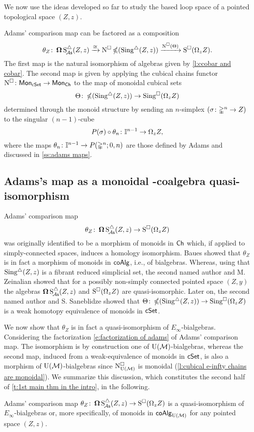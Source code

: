We now use the ideas developed so far to study the based loop space of a pointed topological space $(Z,z)$.

Adams' comparison map can be factored as a composition
\begin{equation}\label{e:factorization of adams}
	\theta_Z \colon \operatorname{\mathbf{\Omega}} \operatorname{S^{\triangle}_{\!{\mathcal{A}\mathsf{s}}}}(Z,z) \xrightarrow{\cong}
	\operatorname{N^{\square}} \operatorname{\mathbb{\Omega}}(\operatorname{Sing^{\triangle}}(Z,z)) \xrightarrow{\operatorname{N^{\square}}(\Theta)}
	\operatorname{S^{\square}}(\Omega_z Z).
\end{equation}
The first map is the natural isomorphism of algebras given by \cref{l:ccobar and cobar}.
The second map is given by applying the cubical chains functor $\operatorname{N^{\square}} \colon \mathsf{Mon}_{\mathsf{cSet}} \to \mathsf{Mon}_{\mathsf{Ch}}$ to the map of monoidal cubical sets
\[
\Theta \colon \operatorname{\mathbb{\Omega}}(\operatorname{Sing^{\triangle}}(Z,z)) \to \operatorname{Sing^{\square}}(\Omega_z Z)
\]
determined through the monoid structure by sending an $n$-simplex $(\sigma \colon \mathbb{\Delta}^n \to Z)$ to the singular $(n-1)$-cube
\[
P(\sigma) \circ \theta_n \colon \mathbb{I}^{n-1} \to \Omega_z Z,
\]
where the maps $\theta_n \colon \mathbb{I}^{n-1} \to P(\mathbb{\Delta}^n;0,n)$ are those defined by Adams and discussed in \cref{ss:adams maps}.

\subsection{Adams's map as a monoidal \pdfEinfty-coalgebra quasi-isomorphism}

Adams' comparison map
\[
\theta_Z \colon \operatorname{\mathbf{\Omega}} \operatorname{S^{\triangle}_{\!{\mathcal{A}\mathsf{s}}}}(Z,z) \to \operatorname{S^{\square}}(\Omega_z Z)
\]
was originally identified to be a morphism of monoids in $\mathsf{Ch}$ which, if applied to simply-connected spaces, induces a homology isomorphism.
Baues showed that $\theta_Z$ is in fact a morphism of monoids in $\mathsf{coAlg}$, i.e., of bialgebras.
Whereas, using that $\operatorname{Sing^{\triangle}}(Z,z)$ is a fibrant reduced simplicial set, the second named author and M. Zeinalian \cite{rivera2018cubical} showed that for a possibly non-simply connected pointed space $(Z,y)$ the algebras $\operatorname{\mathbf{\Omega}} \operatorname{S^{\triangle}_{\!{\mathcal{A}\mathsf{s}}}}(Z,z)$ and $\operatorname{S^{\square}}(\Omega_zZ)$ are quasi-isomorphic.
Later on, the second named author and S. Saneblidze
\cite{rivera2019path} showed that $\Theta \colon \operatorname{\mathbb{\Omega}}(\operatorname{Sing^{\triangle}}(Z,z)) \to \operatorname{Sing^{\square}}(\Omega_z Z)$ is a weak homotopy equivalence of monoids in $\mathsf{cSet}$.

We now show that $\theta_Z$ is in fact a quasi-isomorphism of $E_{\infty}$-bialgebras.
Considering the factorization \eqref{e:factorization of adams} of Adams' comparison map.
The isomorphism is by construction one of ${\operatorname{U}(\mathcal{M})}$-bialgebras, whereas the second map, induced from a weak-equivalence of monoids in $\mathsf{cSet}$, is also a morphism of ${\operatorname{U}(\mathcal{M})}$-bialgebras
since $\operatorname{N^{\square}_{{\operatorname{U}(\mathcal{M})}}}$ is monoidal (\cref{l:cubical e-infty chains are monoidal}).
We summarize this discussion, which constitutes the second half of \cref{t:1st main thm in the intro}, in the following.

\begin{lemma}\label{l:adams comparison is an e-infty bialgebra map}
	Adams' comparison map $\theta_Z \colon \operatorname{\mathbf{\Omega}} \operatorname{S^{\triangle}_{\!{\mathcal{A}\mathsf{s}}}}(Z,z) \to \operatorname{S^{\square}}(\Omega_z Z)$ is a quasi-isomorphism of $E_{\infty}$-bialgebras or, more specifically, of monoids in $\mathsf{coAlg}_{\operatorname{U}(\mathcal{M})}$ for any pointed space $(Z,z)$.
\end{lemma}